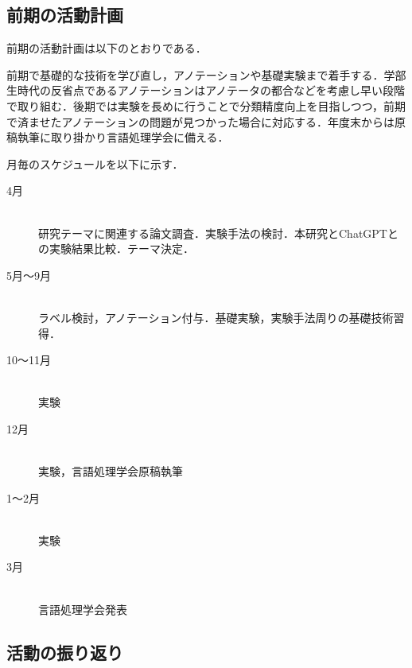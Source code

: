 \documentclass[platex,dvipdfmx,a4paper,twocolumn,base=10.5pt,jbase=10.5pt,ja=standard]{bxjsarticle}
\begin{document}
\subsection{前期の活動計画}
前期の活動計画は以下のとおりである．\par
前期で基礎的な技術を学び直し，アノテーションや基礎実験まで着手する．学部生時代の反省点であるアノテーションはアノテータの都合などを考慮し早い段階で取り組む．後期では実験を長めに行うことで分類精度向上を目指しつつ，前期で済ませたアノテーションの問題が見つかった場合に対応する．年度末からは原稿執筆に取り掛かり言語処理学会に備える．\par
月毎のスケジュールを以下に示す．
\begin{description}
   \item[4月]\mbox{}\\
            研究テーマに関連する論文調査．実験手法の検討．本研究とChatGPTとの実験結果比較．テーマ決定．
   \item[5月〜9月]\mbox{}\\
	    ラベル検討，アノテーション付与．基礎実験，実験手法周りの基礎技術習得．
   \item[10〜11月]\mbox{}\\
	    実験
    \item[12月]\mbox{}\\
           実験，言語処理学会原稿執筆
    \item[1〜2月]\mbox{}\\
           実験
    \item[3月]\mbox{}\\
           言語処理学会発表
\end{description}

\subsection{活動の振り返り}
\end{document}
